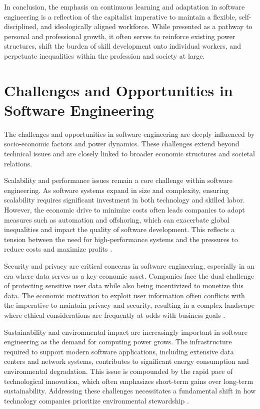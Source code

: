 \begin{refsection}
In conclusion, the emphasis on continuous learning and adaptation in software engineering is a reflection of the capitalist imperative to maintain a flexible, self-disciplined, and ideologically aligned workforce. While presented as a pathway to personal and professional growth, it often serves to reinforce existing power structures, shift the burden of skill development onto individual workers, and perpetuate inequalities within the profession and society at large.

\section{Challenges and Opportunities in Software Engineering}

The challenges and opportunities in software engineering are deeply influenced by socio-economic factors and power dynamics. These challenges extend beyond technical issues and are closely linked to broader economic structures and societal relations.

Scalability and performance issues remain a core challenge within software engineering. As software systems expand in size and complexity, ensuring scalability requires significant investment in both technology and skilled labor. However, the economic drive to minimize costs often leads companies to adopt measures such as automation and offshoring, which can exacerbate global inequalities and impact the quality of software development. This reflects a tension between the need for high-performance systems and the pressures to reduce costs and maximize profits \cite[pp.~68-71]{frey2020technology}.

Security and privacy are critical concerns in software engineering, especially in an era where data serves as a key economic asset. Companies face the dual challenge of protecting sensitive user data while also being incentivized to monetize this data. The economic motivation to exploit user information often conflicts with the imperative to maintain privacy and security, resulting in a complex landscape where ethical considerations are frequently at odds with business goals \cite[pp.~305-310]{zuboff2020surveillance}.

Sustainability and environmental impact are increasingly important in software engineering as the demand for computing power grows. The infrastructure required to support modern software applications, including extensive data centers and network systems, contributes to significant energy consumption and environmental degradation. This issue is compounded by the rapid pace of technological innovation, which often emphasizes short-term gains over long-term sustainability. Addressing these challenges necessitates a fundamental shift in how technology companies prioritize environmental stewardship \cite[pp.~35-39]{sadowski2020internet}.


\end{refsection}
